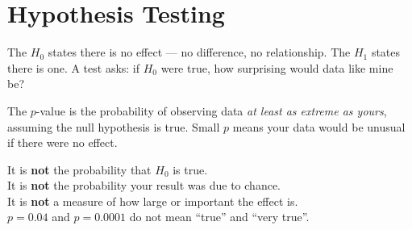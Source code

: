 \section{Hypothesis Testing}

\begin{definitionbox}
The  $H_0$ states there is no effect --- no difference, no
relationship. The  $H_1$ states there is one. A test asks: if
$H_0$ were true, how surprising would data like mine be?
\end{definitionbox}

\begin{definitionbox}[$p$-value]
The $p$-value is the probability of observing data \emph{at least as extreme as
yours}, assuming the null hypothesis is true. Small $p$ means your data would be
unusual if there were no effect.
\end{definitionbox}

\begin{alertbox}
It is \textbf{not} the probability that $H_0$ is true.\\
It is \textbf{not} the probability your result was due to chance.\\
It is \textbf{not} a measure of how large or important the effect is.\\
$p = 0.04$ and $p = 0.0001$ do not mean ``true'' and ``very true''.
\end{alertbox}

